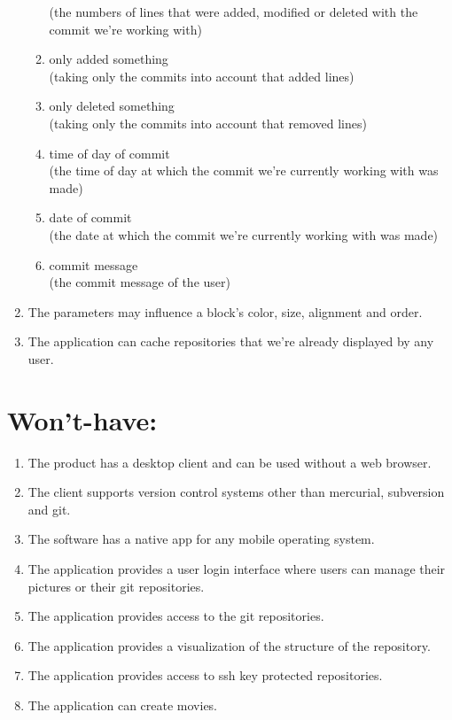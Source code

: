 \documentclass[12pt]{scrartcl}
\begin{document}
\begin{enumerate}
\begin{enumerate}
(the numbers of lines that were added, modified or deleted with the commit we're working with)
\item only added something \\
(taking only the commits into account that added lines)
\item only deleted something\\
(taking only the commits into account that removed lines)
\item time of day of commit\\
(the time of day at which the commit we're currently working with was made)
\item date of commit\\
(the date at which the commit we're currently working with was made)
\item commit message\\
(the commit message of the user)
\end{enumerate}
\item The parameters may influence a block's color, size, alignment and order.
\item The application can cache repositories that we're already displayed by any user.
\end{enumerate}
\newpage
\section{Won't-have:}
\begin{enumerate}
\item The product has a desktop client and can be used without a web browser.
\item The client supports version control systems other than mercurial, subversion and git.
\item The software has a native app for any mobile operating system.
\item The application provides a user login interface where users can manage their pictures or their git repositories.
\item The application provides access to the git repositories.
\item The application provides a visualization of the structure of the repository.
\item The application provides access to ssh key protected repositories.
\item The application can create movies.
\end{enumerate}
\end{document}
